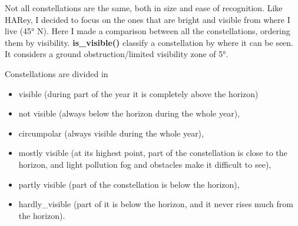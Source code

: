 \documentclass[11pt]{article}
\providecommand{\tightlist}{%
      \setlength{\itemsep}{0pt}\setlength{\parskip}{0pt}}
\begin{document}
Not all constellations are the same, both in size and ease of
recognition. Like HARey, I decided to focus on the ones that are bright
and visible from where I live (45° N). Here I made a comparison between
all the constellations, ordering them by visibility.
\textbf{is\_visible()} classify a constellation by where it can be seen.
It considers a ground obstruction/limited visibility zone of 5°.

Constellations are divided in

\begin{itemize}
\tightlist
\item
  visible (during part of the year it is completely above the horizon)
\item
  not visible (always below the horizon during the whole year),
\item
  circumpolar (always visible during the whole year),
\item
  mostly visible (at its highest point, part of the constellation is
  close to the horizon, and light pollution fog and obstacles make it
  difficult to see),
\item
  partly visible (part of the constellation is below the horizon),
\item
  hardly\_visible (part of it is below the horizon, and it never rises
  much from the horizon).
\end{itemize}
\end{document}
